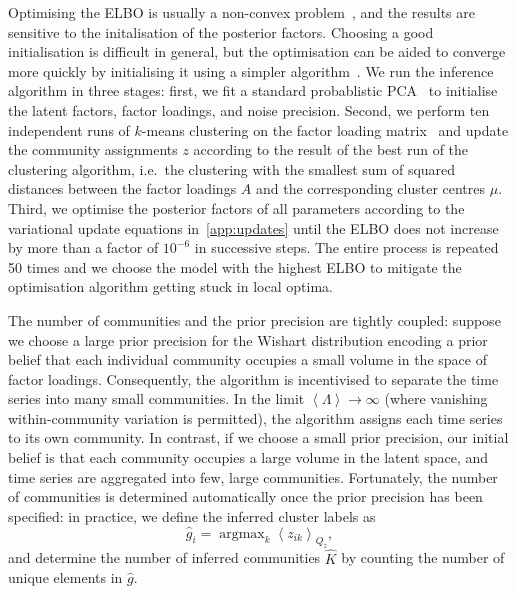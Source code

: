 \documentclass[onecolumn,pre,superscriptaddress, longbibliography, nofootinbib, notitlepage]{revtex4-1}
\newcommand{\E}[1]{\left\langle#1 \right\rangle}
\DeclareMathOperator*{\argmax}{argmax}
\begin{document}
Optimising the ELBO is usually a non-convex problem~\cite{Blei2017}, and the results are sensitive to the initalisation of the posterior factors. Choosing a good initialisation is difficult in general, but the optimisation can be aided to converge more quickly by initialising it using a simpler algorithm~\cite{salter2013variational}. We run the inference algorithm in three stages: 
first, we fit a standard probablistic PCA~\cite{Tipping1999a} to initialise the latent factors, factor loadings, and noise precision. Second, we perform ten independent runs of $k$-means clustering on the factor loading matrix~\cite{Arthur2007} and update the community assignments $z$ according to the result of the best run of the clustering algorithm, i.e.\ the clustering with the smallest sum of squared distances between the factor loadings $A$ and the corresponding cluster centres $\mu$. 
Third, we optimise the posterior factors of all parameters according to the variational update equations in~\cref{app:updates} until the ELBO does not increase by more than a factor of $10^{-6}$ in successive steps. The entire process is repeated 50 times and we choose the model with the highest ELBO to mitigate the optimisation algorithm getting stuck in local optima.

The number of communities and the prior precision are tightly coupled: suppose we choose a large prior precision for the Wishart distribution encoding a prior belief that each individual community occupies a small volume in the space of factor loadings. Consequently, the algorithm is incentivised to separate the time series into many small communities. In the limit $\E{\Lambda}\rightarrow \infty$ (where vanishing within-community variation is permitted), the algorithm assigns each time series to its own community. In contrast, if we choose a small prior precision, our initial belief is that each community occupies a large volume in the latent space, and time series are aggregated into few, large communities. Fortunately, the number of communities is determined automatically once the prior precision has been specified:
in practice, we define the inferred cluster labels as
\[
    \hat g_i = \argmax_{k} \E{z_{ik}}_{Q_z},
\]
and determine the number of inferred communities $\hat K$ by counting the number of unique elements in $\hat g$. 
\end{document}
